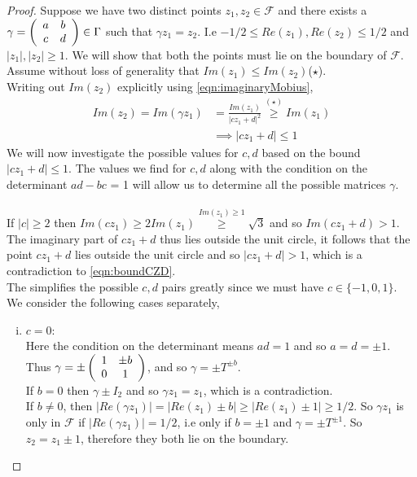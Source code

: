 \begin{proof}

Suppose we have two distinct points $z_1, z_2 \in \mathcal{F}$ and there exists a $\gamma  = \left(\begin{array}{ c c } a & b \\ c & d \end{array} \right) \in \Gamma$ such that $\gamma z_1 = z_2$. I.e $ -1/2 \leq Re(z_1), Re(z_2) \leq 1/2$ and $|z_1|, |z_2| \geq 1$.  We will show that both the points must lie on the boundary of $\mathcal{F}$. \\
Assume without loss of generality that $Im(z_1) \leq Im(z_2)$($\star$). \\
Writing out $Im(z_2)$ explicitly using \ref{eqn:imaginaryMobius}, 
\begin{align}
Im(z_2) = Im(\gamma z_1) &= \frac{Im(z_1)}{{|cz_1 +d |}^2} \overset{(\star)}{\geq} Im(z_1) \nonumber\\
& \implies |cz_1 + d | \leq 1 \label{eqn:boundCZD}
\end{align}
We will now investigate the possible values for $c,d$ based on the bound $|cz_1 +d | \leq 1$. The values we find for $c,d$ along with the condition on the determinant $ad -bc$ = 1 will allow us to determine all the possible matrices $\gamma$.\\
\\
If $|c| \geq 2$ then $Im(cz_1) \geq 2Im(z_1) \overset{Im(z_1) \geq 1}{\geq} \sqrt{3}$ and so $Im(cz_1 +d) > 1$. The imaginary part of $cz_1 +d$ thus lies outside the unit circle, it follows that the point $cz_1 +d$ lies outside the unit circle and so $|cz_1 +d| > 1$, which is a contradiction to \ref{eqn:boundCZD}. \\
The simplifies the possible $c,d$ pairs greatly since we must have $c \in  \{-1,0, 1\}$. \\
We consider the following cases separately, 
\begin{enumerate}[(i)]
\item $c = 0$: \\
Here the condition on the determinant means $ad = 1$ and so $a = d = \pm 1$. Thus $\gamma = \pm \left(\begin{array}{ c c } 1 & \pm b \\ 0 & 1 \end{array} \right)$, and so $\gamma = \pm T^{\pm b}$. \\
If $b = 0$ then $\gamma \pm I_2$ and so $\gamma z_1 = z_1$, which is a contradiction. \\
If $b \neq 0$, then $|Re(\gamma z_1)| = |Re(z_1) \pm b| \geq |Re(z_1) \pm 1| \geq  1/2$. So $\gamma z_1$ is only in $\mathcal{F}$ if $|Re(\gamma z_1)| = 1/2$, i.e only if $b = \pm 1$ and $\gamma = \pm T^{\pm 1}$. So $z_2 = z_1 \pm 1$, therefore they both lie on the boundary. 


\end{enumerate}
\end{proof}
